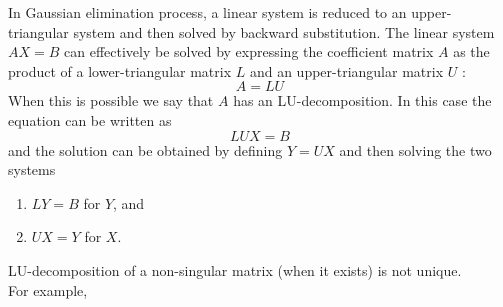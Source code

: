 \documentclass[12pt,class=book,crop=false]{standalone}
\begin{document}
In Gaussian elimination process, a linear system is reduced to an upper-triangular system and then solved by backward substitution. The linear system $ A X = B $ can effectively be solved by expressing the coefficient matrix $ A $ as the product of a lower-triangular matrix $ L $ and an upper-triangular matrix $ U $ :
\[
    A=LU
\]
When this is possible we say that $ A $ has an LU-decomposition. In this case the equation can be written as
\[
    LUX=B
\]
and the solution can be obtained by defining $ Y = U X $ and then solving the two systems
\begin{enumerate}[label={(\roman*)}]
    \item $ LY=B $ for $ Y $, and
    \item $ UX=Y $ for $ X $.
\end{enumerate}
LU-decomposition of a non-singular matrix (when it exists) is not unique.\\
For example,
\end{document}
